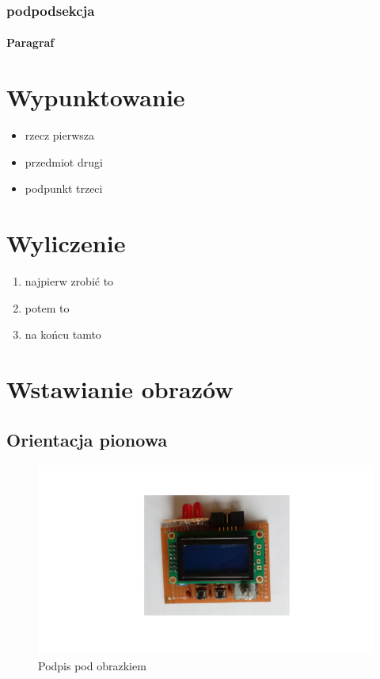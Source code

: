 \documentclass{article}
\begin{document}
\subsubsection{podpodsekcja}
\paragraph{Paragraf}

\section{Wypunktowanie}

\begin{itemize}
	\item	rzecz pierwsza

	\item	przedmiot drugi

	\item	podpunkt trzeci

\end{itemize}

\section{Wyliczenie}

\begin{enumerate}

\item najpierw zrobić to

\item potem to

\item na końcu tamto

\end{enumerate}

\section{Wstawianie obrazów}

\subsection{Orientacja pionowa}
\begin{figure}[H]
	\includegraphics[width=\textwidth]{img/morse_main_view.png}
	\caption{Podpis pod obrazkiem}
	\label{fig:zdjecie1}
\end{figure}
\end{document}
